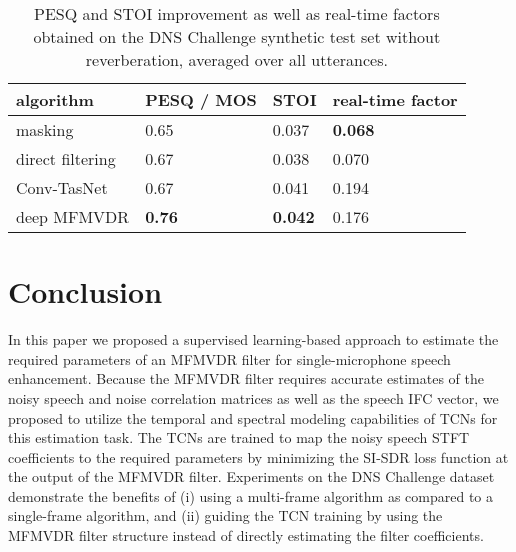 \documentclass{article}
\begin{document}
\begin{table}
	\begin{tabularx}{\linewidth}{l|l|l|l}
		algorithm & PESQ / MOS & STOI & real-time factor\\
		\toprule[2pt]
		masking & 0.65 & 0.037 & \textbf{0.068}\\
		direct filtering & 0.67 & 0.038 & 0.070\\
		Conv-TasNet & 0.67 & 0.041 & 0.194\\
		\midrule[1pt]
		deep MFMVDR & \textbf{0.76} & \textbf{0.042} & 0.176
	\end{tabularx}
	\caption{PESQ and STOI improvement as well as real-time factors obtained on the DNS Challenge synthetic test set without reverberation, averaged over all utterances.}
	\label{tab:results}
\end{table}

\section{Conclusion}
In this paper we proposed a supervised learning-based approach to estimate the required parameters of an MFMVDR filter for single-microphone speech enhancement.
Because the MFMVDR filter requires accurate estimates of the noisy speech and noise correlation matrices as well as the speech IFC vector, we proposed to utilize the temporal and spectral modeling capabilities of TCNs for this estimation task.
The TCNs are trained to map the noisy speech STFT coefficients to the required parameters by minimizing the SI-SDR loss function at the output of the MFMVDR filter.
Experiments on the DNS Challenge dataset demonstrate the benefits of (i) using a multi-frame algorithm as compared to a single-frame algorithm, and (ii) guiding the TCN training by using the MFMVDR filter structure instead of directly estimating the filter coefficients.



\end{document}
